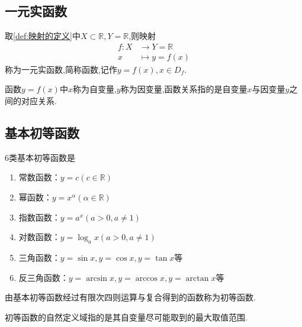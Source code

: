 \subsection{一元实函数}
\begin{formal}
    \begin{definition}[一元实函数的定义]\label{def:一元实函数的定义}
        取\cref{def:映射的定义}中$X\subset\mathbb{R},Y=\mathbb{R}$,则映射\begin{align*}
            f:X&\longrightarrow Y=\mathbb{R}\\
            x&\longmapsto y=f\left( x \right)
        \end{align*}称为一元实函数,简称函数,记作$y=f\left(x\right),x\in D_f.$
    \end{definition}
\end{formal}
\begin{formal}
    \begin{definition}\label{def:自变量、因变量与函数关系的定义}
        函数$y=f\left(x\right)$中$x$称为自变量,$y$称为因变量,函数关系指的是自变量$x$与因变量$y$之间的对应关系.
    \end{definition}
\end{formal}
\subsection{基本初等函数}
\begin{formal}
    \begin{proposition}[基本初等函数]\label{prop:基本初等函数}
        $6$类基本初等函数是\begin{enumerate}[label={\textup{(\arabic*)}}]
            \item 常数函数：$y=c\left(c\in \mathbb{R}\right)$
            \item 幂函数：$y=x^{\alpha}\left(\alpha\in\mathbb{R}\right)$
            \item 指数函数：$y=a^x\left(a>0,a\neq 1\right)$
            \item 对数函数：$y=\log_a x\left(a>0,a\neq 1\right)$
            \item 三角函数：$y=\sin x,y=\cos x,y=\tan x$等
            \item 反三角函数：$y=\arcsin x,y=\arccos x,y=\arctan x$等
        \end{enumerate}
    \end{proposition}
\end{formal}
\begin{formal}
    \begin{definition}[初等函数的定义]\label{def:初等函数的定义}
        由基本初等函数经过有限次四则运算与复合得到的函数称为初等函数.
    \end{definition}
\end{formal}
\begin{formal}
    \begin{definition}[初等函数的自然定义域的定义]\label{def:初等函数的自然定义域的定义}
        初等函数的自然定义域指的是其自变量尽可能取到的最大取值范围.
    \end{definition}
\end{formal}
